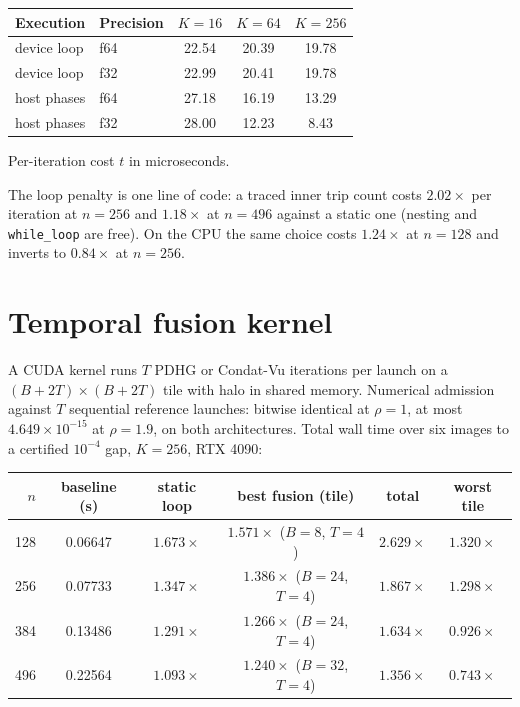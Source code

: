 \documentclass[11pt]{article}
\begin{document}
\begin{center}
\small
\begin{tabular}{llccc}
\toprule
Execution & Precision & $K=16$ & $K=64$ & $K=256$ \\
\midrule
device loop & f64 & 22.54 & 20.39 & 19.78 \\
device loop & f32 & 22.99 & 20.41 & 19.78 \\
host phases & f64 & 27.18 & 16.19 & 13.29 \\
host phases & f32 & 28.00 & 12.23 & 8.43 \\
\bottomrule
\end{tabular}

Per-iteration cost $t$ in microseconds.
\end{center}

The loop penalty is one line of code: a traced inner trip count costs
$2.02\times$ per iteration at $n=256$ and $1.18\times$ at $n=496$ against a
static one (nesting and \texttt{while\_loop} are free). On the CPU the same
choice costs $1.24\times$ at $n=128$ and inverts to $0.84\times$ at $n=256$.

\section{Temporal fusion kernel}
\label{app:log:fusion}

A CUDA kernel runs $T$ PDHG or Condat-Vu iterations per launch on a
$(B+2T)\times(B+2T)$ tile with halo in shared memory. Numerical admission
against $T$ sequential reference launches: bitwise identical at $\rho=1$, at
most $4.649\times10^{-15}$ at $\rho=1.9$, on both architectures. Total wall
time over six images to a certified $10^{-4}$ gap, $K=256$, RTX 4090:

\begin{center}
\small
\begin{tabular}{rccccc}
\toprule
$n$ & baseline (s) & static loop & best fusion (tile) & total & worst tile \\
\midrule
128 & 0.06647 & $1.673\times$ & $1.571\times$ ($B=8$, $T=4$) & $2.629\times$ & $1.320\times$ \\
256 & 0.07733 & $1.347\times$ & $1.386\times$ ($B=24$, $T=4$) & $1.867\times$ & $1.298\times$ \\
384 & 0.13486 & $1.291\times$ & $1.266\times$ ($B=24$, $T=4$) & $1.634\times$ & $0.926\times$ \\
496 & 0.22564 & $1.093\times$ & $1.240\times$ ($B=32$, $T=4$) & $1.356\times$ & $0.743\times$ \\
\bottomrule
\end{tabular}
\end{center}
\end{document}
